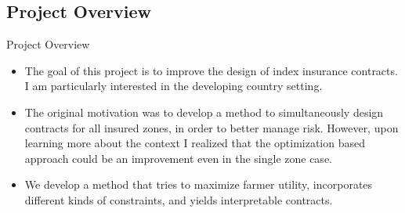 \documentclass{beamer}
\begin{document}

\subsection*{Project Overview}
\begin{frame}{Project Overview}
 \begin{itemize}
    \setlength\itemsep{1em}   
    \item The goal of this project is to improve the design of index insurance contracts. I am particularly interested in the developing country setting.  
    \item The original motivation was to develop a method to simultaneously design contracts for all insured zones, in order to better manage risk. However, upon learning more about the context I realized that the optimization based approach could be an improvement even in the single zone case. 
    \item We develop a method that tries to maximize farmer utility, incorporates different kinds of constraints, and yields interpretable contracts. 
 \end{itemize}
\end{frame}
\end{document}
